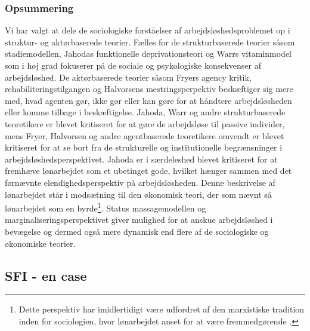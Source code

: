 \subsubsection{Opsummering}

Vi har valgt at dele de sociologiske forståelser af arbejdsløshedsproblemet op i struktur- og aktørbaserede teorier. Fælles for de strukturbaserede teorier såsom stadiemodellen, Jahodas funktionelle deprivationsteori og Warrs vitaminmodel som i høj grad fokuserer på de sociale og psykologiske konsekvenser af arbejdsløshed. De aktørbaserede teorier såsom Fryers agency kritik, rehabiliteringstilgangen og Halvorsens mestringsperpektiv beskæftiger sig mere med, hvad agenten gør, ikke gør eller kan gøre for at håndtere arbejdsløsheden eller komme tilbage i beskæftigelse. Jahoda, Warr og andre strukturbaserede teoretikere er blevet kritiseret for at gøre de arbejdsløse til passive individer, mens Fryer, Halvorsen og andre agentbaserede teoretikere omvendt er blevet kritiseret for at se bort fra de strukturelle og institutionelle begrænsninger i arbejdsløshedsperspektivet. Jahoda er i særdeleshed blevet kritiseret for at fremhæve  lønarbejdet som et ubetinget gode, hvilket hænger sammen med det førnævnte elendighedsperspektiv på arbejdsløsheden. Denne beskrivelse af lønarbejdet står i modsætning til den økonomisk teori, der som nævnt så lønarbejdet som en byrde\footnote{Dette perspektiv har imidlertidigt være udfordret af den marxistiske tradition inden for sociologien, hvor lønarbejdet anset for at være fremmedgørende \parencite[48]{Halvorsen1999}.}. Status massagemodellen og marginaliseringsperspektivet giver mulighed for at anskue arbejdsløshed i bevægelse og dermed også mere dynamisk end flere af de sociologiske og økonomiske teorier.





\newpage \subsection{SFI - en case}

